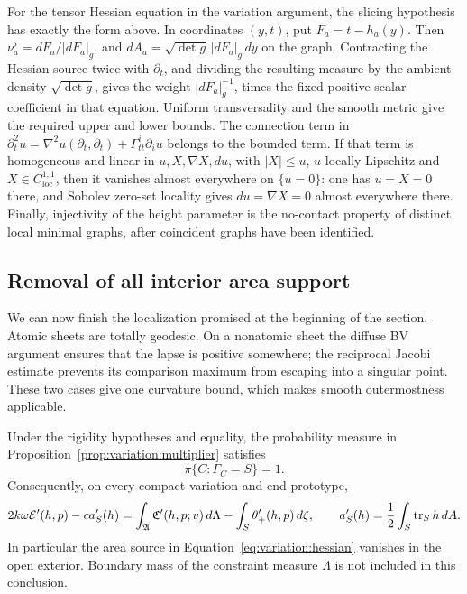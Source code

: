 \begin{remark}
For the tensor Hessian equation in the variation argument, the
slicing hypothesis has exactly the form above.  In coordinates
$(y,t)$, put $F_a=t-h_a(y)$.  Then
$\nu_a^\flat=dF_a/|dF_a|_g$, and
$dA_a=\sqrt{\det g}\,|dF_a|_g\,dy$ on the graph.
Contracting the Hessian source twice with $\partial_t$, and dividing
the resulting measure by the ambient density
$\sqrt{\det g}$, gives the weight $|dF_a|_g^{-1}$, times the fixed
positive scalar coefficient in that equation.  Uniform
transversality and the smooth metric give the required upper and
lower bounds.  The connection term in
$\partial_t^2u=\nabla^2u(\partial_t,\partial_t)
+\Gamma^i_{tt}\partial_i u$ belongs to the bounded term.
If that term is homogeneous and linear in $u,X,\nabla X,du$, with
$|X|\leq u$, $u$ locally Lipschitz and $X\in C^{1,1}_{\mathrm{loc}}$,
then it vanishes almost everywhere on $\{u=0\}$: one has $u=X=0$
there, and Sobolev zero-set locality gives $du=\nabla X=0$ almost
everywhere there.  Finally, injectivity of the height parameter is
the no-contact property of distinct local minimal graphs, after
coincident graphs have been identified.
\end{remark}

\subsection{Removal of all interior area support}

We can now finish the localization promised at the beginning of the
section. Atomic sheets are totally geodesic. On a nonatomic sheet the
diffuse BV argument ensures that the lapse is positive somewhere;
the reciprocal Jacobi estimate prevents its comparison maximum from
escaping into a singular point. These two cases give one curvature
bound, which makes smooth outermostness applicable.


\begin{theorem}
\label{thm:variation:boundary-support}
Under the rigidity hypotheses and equality, the probability measure
in Proposition~\ref{prop:variation:multiplier} satisfies
\[
 \pi\{C:\Gamma_C=S\}=1.
\]
Consequently, on every compact variation and end prototype,
\begin{equation}\label{eq:variation:boundary-multiplier}
 2k\omega\mathcal E'(h,p)-c a'_S(h)
 =\int_{\mathfrak A}\mathfrak C'(h,p;v)\,d\Lambda
       -\int_S\theta'_+(h,p)\,d\zeta,
 \qquad
 a'_S(h)=\frac12\int_S\operatorname{tr}_Sh\,dA.
\end{equation}
In particular the area source in
Equation~\eqref{eq:variation:hessian} vanishes in the open exterior.  Boundary
mass of the constraint measure $\Lambda$ is not included in this
conclusion.
\end{theorem}

